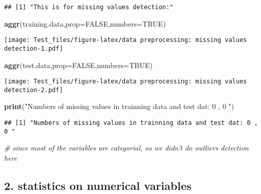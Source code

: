 \documentclass[]{article}
\newenvironment{Shaded}{\begin{snugshade}}{\end{snugshade}}
\newcommand{\KeywordTok}[1]{\textcolor[rgb]{0.13,0.29,0.53}{\textbf{#1}}}
\newcommand{\DataTypeTok}[1]{\textcolor[rgb]{0.13,0.29,0.53}{#1}}
\newcommand{\StringTok}[1]{\textcolor[rgb]{0.31,0.60,0.02}{#1}}
\newcommand{\CommentTok}[1]{\textcolor[rgb]{0.56,0.35,0.01}{\textit{#1}}}
\newcommand{\OtherTok}[1]{\textcolor[rgb]{0.56,0.35,0.01}{#1}}
\newcommand{\NormalTok}[1]{#1}
\begin{document}
\begin{verbatim}
## [1] "This is for missing values detection:"
\end{verbatim}

\begin{Shaded}
\begin{Highlighting}[]
\KeywordTok{aggr}\NormalTok{(training.data,}\DataTypeTok{prop=}\OtherTok{FALSE}\NormalTok{,}\DataTypeTok{numbers=}\OtherTok{TRUE}\NormalTok{)}
\end{Highlighting}
\end{Shaded}

\texttt{[image: Test\_files/figure-latex/data preprocessing: missing values detection-1.pdf]}

\begin{Shaded}
\begin{Highlighting}[]
\KeywordTok{aggr}\NormalTok{(test.data,}\DataTypeTok{prop=}\OtherTok{FALSE}\NormalTok{,}\DataTypeTok{numbers=}\OtherTok{TRUE}\NormalTok{)}
\end{Highlighting}
\end{Shaded}

\texttt{[image: Test\_files/figure-latex/data preprocessing: missing values detection-2.pdf]}

\begin{Shaded}
\begin{Highlighting}[]
\KeywordTok{print}\NormalTok{(}\StringTok{"Numbers of missing values in trainning data and test dat: 0 , 0 "}\NormalTok{)}
\end{Highlighting}
\end{Shaded}

\begin{verbatim}
## [1] "Numbers of missing values in trainning data and test dat: 0 , 0 "
\end{verbatim}

\begin{Shaded}
\begin{Highlighting}[]
\CommentTok{# since most of the variables are categorial, so we didn't do outliers detection here }
\end{Highlighting}
\end{Shaded}

\subsection{2. statistics on numerical
variables}\label{statistics-on-numerical-variables}
\end{document}
